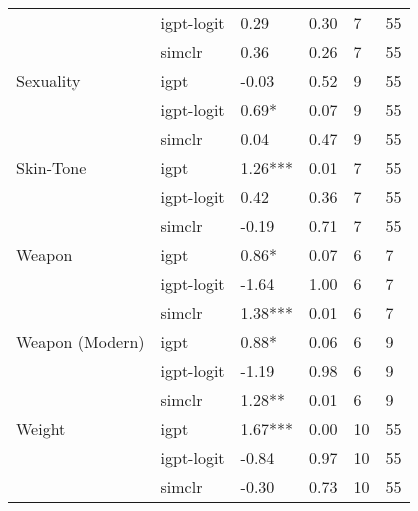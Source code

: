 \begin{tabular}{llllll}
       & igpt-logit &     0.29 & 0.30 &     7 &    55 \\
       & simclr &     0.36 & 0.26 &     7 &    55 \\
Sexuality & igpt &    -0.03 & 0.52 &     9 &    55 \\
       & igpt-logit &    0.69* & 0.07 &     9 &    55 \\
       & simclr &     0.04 & 0.47 &     9 &    55 \\
Skin-Tone & igpt &  1.26*** & 0.01 &     7 &    55 \\
       & igpt-logit &     0.42 & 0.36 &     7 &    55 \\
       & simclr &    -0.19 & 0.71 &     7 &    55 \\
Weapon & igpt &    0.86* & 0.07 &     6 &     7 \\
       & igpt-logit &    -1.64 & 1.00 &     6 &     7 \\
       & simclr &  1.38*** & 0.01 &     6 &     7 \\
Weapon (Modern) & igpt &    0.88* & 0.06 &     6 &     9 \\
       & igpt-logit &    -1.19 & 0.98 &     6 &     9 \\
       & simclr &   1.28** & 0.01 &     6 &     9 \\
Weight & igpt &  1.67*** & 0.00 &    10 &    55 \\
       & igpt-logit &    -0.84 & 0.97 &    10 &    55 \\
       & simclr &    -0.30 & 0.73 &    10 &    55 \\
\bottomrule
\end{tabular}
